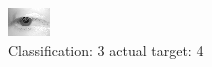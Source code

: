 \begin{figure}[h!]
\begin{center}
\includegraphics[width=0.60\columnwidth]{figures/ID2662_class_3_target_4.png}
\end{center}
\caption{ Classification: 3 actual target: 4}
\label{fig:ID2662_class_3_target_4}
\end{figure}

